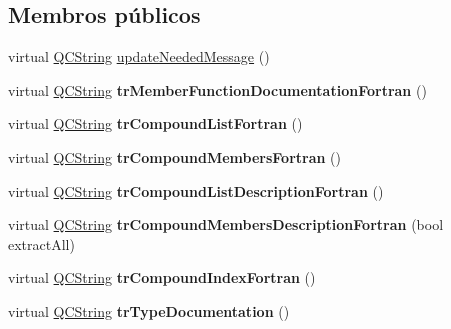 \subsection*{Membros públicos}
\begin{DoxyCompactItemize}
\item 
virtual \hyperlink{class_q_c_string}{Q\-C\-String} \hyperlink{class_translator_adapter__1__5__4_aa2c053398a494e36caf5152d9a4fc6cf}{update\-Needed\-Message} ()
\item 
\hypertarget{class_translator_adapter__1__5__4_a006270b30df57f83fe40ad0ed617652e}{virtual \hyperlink{class_q_c_string}{Q\-C\-String} {\bfseries tr\-Member\-Function\-Documentation\-Fortran} ()}\label{class_translator_adapter__1__5__4_a006270b30df57f83fe40ad0ed617652e}

\item 
\hypertarget{class_translator_adapter__1__5__4_a17985bd956c4940e53e169cadb659c2b}{virtual \hyperlink{class_q_c_string}{Q\-C\-String} {\bfseries tr\-Compound\-List\-Fortran} ()}\label{class_translator_adapter__1__5__4_a17985bd956c4940e53e169cadb659c2b}

\item 
\hypertarget{class_translator_adapter__1__5__4_add44aa8baf655554ec74dbfac0d43f71}{virtual \hyperlink{class_q_c_string}{Q\-C\-String} {\bfseries tr\-Compound\-Members\-Fortran} ()}\label{class_translator_adapter__1__5__4_add44aa8baf655554ec74dbfac0d43f71}

\item 
\hypertarget{class_translator_adapter__1__5__4_a10aa72b35051f95ba30f2b0312ce705c}{virtual \hyperlink{class_q_c_string}{Q\-C\-String} {\bfseries tr\-Compound\-List\-Description\-Fortran} ()}\label{class_translator_adapter__1__5__4_a10aa72b35051f95ba30f2b0312ce705c}

\item 
\hypertarget{class_translator_adapter__1__5__4_a0c98da65b5772e9c2876855a42d44127}{virtual \hyperlink{class_q_c_string}{Q\-C\-String} {\bfseries tr\-Compound\-Members\-Description\-Fortran} (bool extract\-All)}\label{class_translator_adapter__1__5__4_a0c98da65b5772e9c2876855a42d44127}

\item 
\hypertarget{class_translator_adapter__1__5__4_a933624b6cffb8fdc03e9fc4110640fc9}{virtual \hyperlink{class_q_c_string}{Q\-C\-String} {\bfseries tr\-Compound\-Index\-Fortran} ()}\label{class_translator_adapter__1__5__4_a933624b6cffb8fdc03e9fc4110640fc9}

\item 
\hypertarget{class_translator_adapter__1__5__4_ae031421205271f1a32fa3838a79b8902}{virtual \hyperlink{class_q_c_string}{Q\-C\-String} {\bfseries tr\-Type\-Documentation} ()}\label{class_translator_adapter__1__5__4_ae031421205271f1a32fa3838a79b8902}


\end{DoxyCompactItemize}
